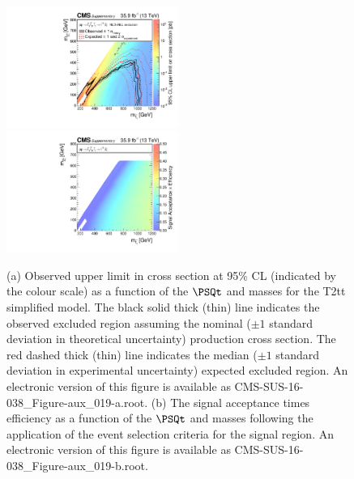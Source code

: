 \begin{figure}
    \begin{center}
            \includegraphics[width=0.50\textwidth]{Supplementary/CMS-SUS-16-038_Figure-aux_019-a}
            \includegraphics[width=0.50\textwidth]{Supplementary/CMS-SUS-16-038_Figure-aux_019-b}
        \caption{ (a) Observed upper limit in cross section at 95\% CL (indicated
        by the colour scale) as a function of 
        the $\PSQt$ and \PSGczDo %
        masses for the 
        T2tt %
        simplified  model.  The  black  solid thick  (thin)  line indicates  the
        observed  excluded  region  assuming   the  nominal  (${\pm}1$  standard
        deviation in theoretical uncertainty)  production cross section. The red
        dashed  thick  (thin)  line  indicates  the  median  (${\pm}1$  standard
        deviation in experimental uncertainty) expected excluded region.
    An electronic version of this figure is available as CMS-SUS-16-038\_Figure-aux\_019-a.root.
        (b) The signal acceptance times efficiency as a function of 
        the $\PSQt$ and \PSGczDo %
        masses following the application of the event selection criteria for the signal region.
    An electronic version of this figure is available as CMS-SUS-16-038\_Figure-aux\_019-b.root.
        }
        \label{fig:T2tt}
    \end{center}
\end{figure}

